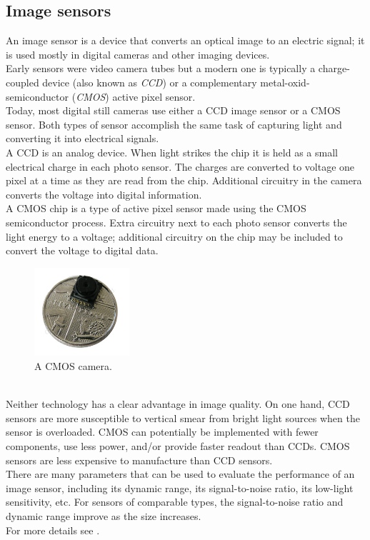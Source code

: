 \subsection{Image sensors}
\label{intro:mobile:image}

An image sensor is a device that converts an optical image to an electric
signal; it is used mostly in digital cameras and other imaging devices.
\\
Early sensors were video camera tubes but a modern one is typically a
charge-coupled device (also known as \textit{CCD}) or a complementary
metal-oxid-semiconductor (\textit{CMOS}) active pixel sensor.
\\
Today, most digital still cameras use either a CCD image sensor or a
CMOS sensor. Both types of sensor accomplish the same task of capturing
light and converting it into electrical signals.
\\
A CCD is an analog device. When light strikes the chip it is held as a small
electrical charge in each photo sensor. The charges are converted to voltage
one pixel at a time as they are read from the chip. Additional circuitry in
the camera converts the voltage into digital information.
\\
A CMOS chip is a type of active pixel sensor made using the CMOS semiconductor
process. Extra circuitry next to each photo sensor converts the light
energy to a voltage; additional circuitry on the chip may be included
to convert the voltage to digital data.
\begin{figure} [!h]
  \begin{center}
    \includegraphics[width=100pt]{img/cmos_camera.jpg}
    \caption{A CMOS camera.}
    \label{fig:cmos_camera}
  \end{center}
\end{figure}
\\
Neither technology has a clear advantage in image quality. On one hand,
CCD sensors are more susceptible to vertical smear from bright light sources
when the sensor is overloaded.
CMOS can potentially be implemented with fewer components, use less power,
and/or provide faster readout than CCDs.
CMOS sensors are less expensive to manufacture than CCD sensors.
\\
There are many parameters that can be used to evaluate the performance
of an image sensor, including its dynamic range, its signal-to-noise ratio,
its low-light sensitivity, etc. For sensors of comparable types,
the signal-to-noise ratio and dynamic range improve as the size increases.
\\
For more details see \cite{wiki:image_sensor}.

